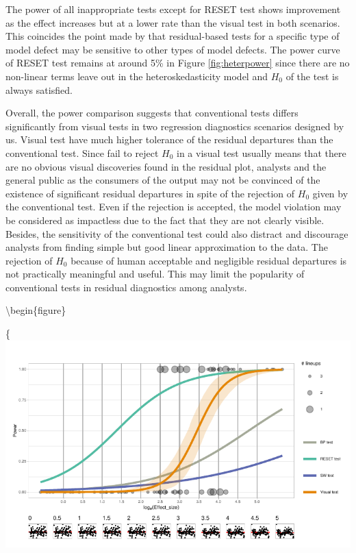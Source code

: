 \documentclass[]{interact}
\theoremstyle{plain}%
\theoremstyle{definition}
\theoremstyle{remark}
\begin{document}
The power of all inappropriate tests except for RESET test shows
improvement as the effect increases but at a lower rate than the visual
test in both scenarios. This coincides the point made by
\citet{cook1982residuals} that residual-based tests for a specific type
of model defect may be sensitive to other types of model defects. The
power curve of RESET test remains at around 5\% in Figure
\ref{fig:heterpower} since there are no non-linear terms leave out in
the heteroskedasticity model and \(H_0\) of the test is always
satisfied.

Overall, the power comparison suggests that conventional tests differs
significantly from visual tests in two regression diagnostics scenarios
designed by us. Visual test have much higher tolerance of the residual
departures than the conventional test. Since fail to reject \(H_0\) in a
visual test usually means that there are no obvious visual discoveries
found in the residual plot, analysts and the general public as the
consumers of the output may not be convinced of the existence of
significant residual departures in spite of the rejection of \(H_0\)
given by the conventional test. Even if the rejection is accepted, the
model violation may be considered as impactless due to the fact that
they are not clearly visible. Besides, the sensitivity of the
conventional test could also distract and discourage analysts from
finding simple but good linear approximation to the data. The rejection
of \(H_0\) because of human acceptable and negligible residual
departures is not practically meaningful and useful. This may limit the
popularity of conventional tests in residual diagnostics among analysts.

\textbackslash begin\{figure\}

\{\centering \includegraphics[width=1\linewidth]{paper_comparison_files/figure-latex/polypower-1}
\end{document}
